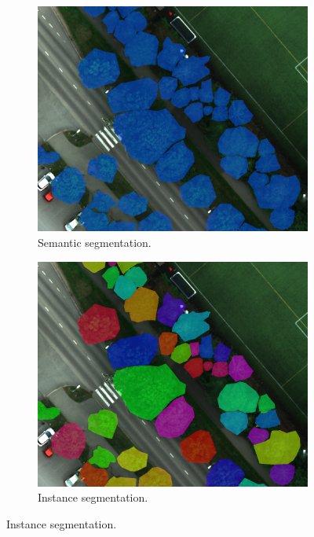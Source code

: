 \documentclass[english, 12pt, a4paper, sci, utf8, a-2b, online]{aaltothesis}
\begin{document}
\begin{figure}[h]
    \centering
    \begin{subfigure}[b]{0.32\textwidth}
        \includegraphics[width=1.0\textwidth]{figures/task-comparison/sem-seg.png}
        \caption{Semantic segmentation.}
    \end{subfigure}
    \begin{subfigure}[b]{0.32\textwidth}
        \includegraphics[width=1.0\textwidth]{figures/task-comparison/instance-seg.png}
        \caption{Instance segmentation.}
    \end{subfigure}

\end{figure}
\end{document}
